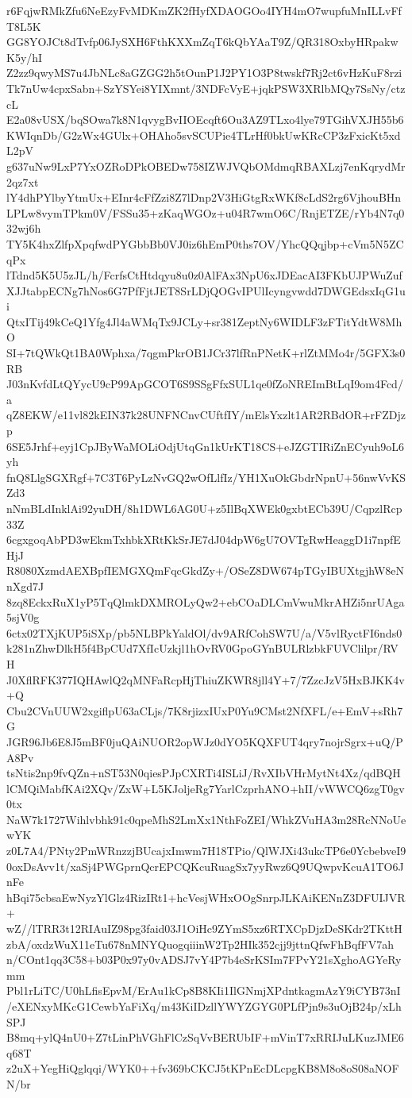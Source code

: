 r6FqjwRMkZfu6NeEzyFvMDKmZK2fHyfXDAOGOo4IYH4mO7wupfuMnILLvFfT8L5K
GG8YOJCt8dTvfp06JySXH6FthKXXmZqT6kQbYAaT9Z/QR318OxbyHRpakwK5y/hI
Z2zz9qwyMS7u4JbNLc8aGZGG2h5tOunP1J2PY1O3P8twskf7Rj2ct6vHzKuF8rzi
Tk7nUw4cpxSabn+SzYSYei8YIXmnt/3NDFcVyE+jqkPSW3XRlbMQy7SsNy/ctzcL
E2a08vUSX/bqSOwa7k8N1qvygBvIIOEcqft6Ou3AZ9TLxo4lye79TGihVXJH55b6
KWIqnDb/G2zWx4GUlx+OHAho5svSCUPie4TLrHf0bkUwKRcCP3zFxicKt5xdL2pV
g637uNw9LxP7YxOZRoDPkOBEDw758IZWJVQbOMdmqRBAXLzj7enKqrydMr2qz7xt
lY4dhPYlbyYtmUx+EInr4cFfZzi8Z7lDnp2V3HiGtgRxWKf8cLdS2rg6VjhouBHn
LPLw8vymTPkm0V/FSSu35+zKaqWGOz+u04R7wmO6C/RnjETZE/rYb4N7q032wj6h
TY5K4hxZlfpXpqfwdPYGbbBb0VJ0iz6hEmP0ths7OV/YhcQQqjbp+cVm5N5ZCqPx
lTdnd5K5U5zJL/h/FcrfsCtHtdqyu8u0z0AlFAx3NpU6xJDEacAI3FKbUJPWuZuf
XJJtabpECNg7hNos6G7PfFjtJET8SrLDjQOGvIPUlIcyngvwdd7DWGEdsxIqG1ui
QtxITij49kCeQ1Yfg4Jl4aWMqTx9JCLy+sr381ZeptNy6WIDLF3zFTitYdtW8MhO
SI+7tQWkQt1BA0Wphxa/7qgmPkrOB1JCr37lfRnPNetK+rlZtMMo4r/5GFX3s0RB
J03nKvfdLtQYycU9cP99ApGCOT6S9SSgFfxSUL1qe0fZoNREImBtLqI9om4Fcd/a
qZ8EKW/e11vl82kEIN37k28UNFNCnvCUftfIY/mElsYxzlt1AR2RBdOR+rFZDjzp
6SE5Jrhf+eyj1CpJByWaMOLiOdjUtqGn1kUrKT18CS+eJZGTIRiZnECyuh9oL6yh
fnQ8LlgSGXRgf+7C3T6PyLzNvGQ2wOfLlfIz/YH1XuOkGbdrNpnU+56nwVvKSZd3
nNmBLdInklAi92yuDH/8h1DWL6AG0U+z5IlBqXWEk0gxbtECb39U/CqpzlRcp33Z
6cgxgoqAbPD3wEkmTxhbkXRtKkSrJE7dJ04dpW6gU7OVTgRwHeaggD1i7npfEHjJ
R8080XzmdAEXBpfIEMGXQmFqcGkdZy+/OSeZ8DW674pTGyIBUXtgjhW8eNnXgd7J
8zq8EckxRuX1yP5TqQlmkDXMROLyQw2+ebCOaDLCmVwuMkrAHZi5nrUAga5sjV0g
6ctx02TXjKUP5iSXp/pb5NLBPkYaldOl/dv9ARfCohSW7U/a/V5vlRyctFI6nds0
k281nZhwDlkH5f4BpCUd7XfIcUzkjl1hOvRV0GpoGYnBULRlzbkFUVClilpr/RVH
J0XflRFK377IQHAwlQ2qMNFaRcpHjThiuZKWR8jll4Y+7/7ZzcJzV5HxBJKK4v+Q
Cbu2CVnUUW2xgiflpU63aCLjs/7K8rjizxIUxP0Yu9CMst2NfXFL/e+EmV+sRh7G
JGR96Jb6E8J5mBF0juQAiNUOR2opWJz0dYO5KQXFUT4qry7nojrSgrx+uQ/PA8Pv
tsNtis2np9fvQZn+nST53N0qiesPJpCXRTi4ISLiJ/RvXIbVHrMytNt4Xz/qdBQH
lCMQiMabfKAi2XQv/ZxW+L5KJoljeRg7YarlCzprhANO+hII/vWWCQ6zgT0gv0tx
NaW7k1727Wihlvbhk91c0qpeMhS2LmXx1NthFoZEI/WhkZVuHA3m28RcNNoUewYK
z0L7A4/PNty2PmWRnzzjBUcajxImwm7H18TPio/QlWJXi43ukcTP6e0YcbebveI9
0oxDsAvv1t/xaSj4PWGprnQcrEPCQKcuRuagSx7yyRwz6Q9UQwpvKcuA1TO6JnFe
hBqi75cbsaEwNyzYlGlz4RizIRt1+hcVesjWHxOOgSnrpJLKAiKENnZ3DFUIJVR+
wZ//lTRR3t12RIAuIZ98pg3faid03J1OiHc9ZYmS5xz6RTXCpDjzDeSKdr2TKttH
zbA/oxdzWuX11eTu678nMNYQuogqiiinW2Tp2HIk352cjj9jttnQfwFhBqfFV7ah
n/COnt1qq3C58+b03P0x97y0vADSJ7vY4P7b4eSrKSIm7FPvY21sXghoAGYeRymm
Pbl1rLiTC/U0hLfisEpvM/ErAu1kCp8B8KIi1IlGNmjXPdntkagmAzY9iCYB73nI
/eXENxyMKcG1CewbYaFiXq/m43KiIDzllYWYZGYG0PLfPjn9s3uOjB24p/xLhSPJ
B8mq+ylQ4nU0+Z7tLinPhVGhFlCzSqVvBERUbIF+mVinT7xRRIJuLKuzJME6q68T
z2uX+YegHiQglqqi/WYK0++fv369bCKCJ5tKPnEcDLcpgKB8M8o8oS08aNOFN/br
